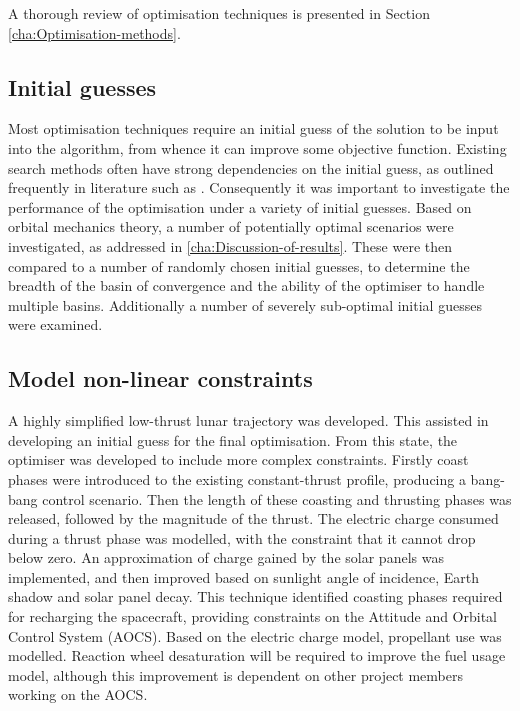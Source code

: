 A thorough review of optimisation techniques is presented in Section \ref{cha:Optimisation-methods}.

\subsection{Initial guesses} \label{sub:Initial-guesses}

Most optimisation techniques require an initial guess of the solution to be input into the algorithm, from whence it can improve some objective function. Existing search methods often have strong dependencies on the initial guess, as outlined frequently in literature such as \textcite{Dachwald2005}. Consequently it was important to investigate the performance of the optimisation under a variety of initial guesses. Based on orbital mechanics theory, a number of potentially optimal scenarios were investigated, as addressed in \autoref{cha:Discussion-of-results}. These were then compared to a number of randomly chosen initial guesses, to determine the breadth of the basin of convergence and the ability of the optimiser to handle multiple basins. Additionally a number of severely sub-optimal initial guesses were examined.

\subsection{Model non-linear constraints} \label{sub:Model-non-linear-constraints}

A highly simplified low-thrust lunar trajectory was developed. This assisted in developing an initial guess for the final optimisation. From this state, the optimiser was developed to include more complex constraints. Firstly coast phases were introduced to the existing constant-thrust profile, producing a bang-bang control scenario. Then the length of these coasting and thrusting phases was released, followed by the magnitude of the thrust. The electric charge consumed during a thrust phase was modelled, with the constraint that it cannot drop below zero. An approximation of charge gained by the solar panels was implemented, and then improved based on sunlight angle of incidence, Earth shadow and solar panel decay. This technique identified coasting phases required for recharging the spacecraft, providing constraints on the Attitude and Orbital Control System (AOCS). Based on the electric charge model, propellant use was modelled. Reaction wheel desaturation will be required to improve the fuel usage model, although this improvement is dependent on other project members working on the AOCS.

